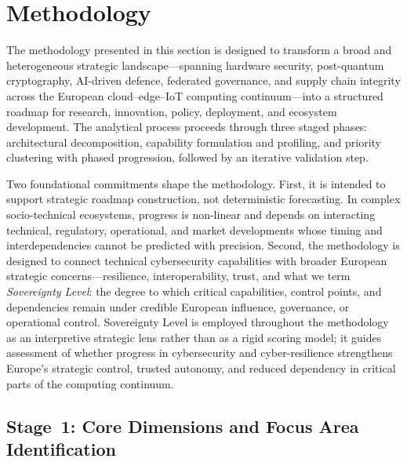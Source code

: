 
\section{Methodology}
\label{sec:methodology}

The methodology presented in this section is designed to transform a broad and heterogeneous strategic landscape---spanning hardware security, post-quantum cryptography, AI-driven defence, federated governance, and supply chain integrity across the European cloud--edge--IoT computing continuum---into a structured roadmap for research, innovation, policy, deployment, and ecosystem development. The analytical process proceeds through three staged phases: architectural decomposition, capability formulation and profiling, and priority clustering with phased progression, followed by an iterative validation step.

Two foundational commitments shape the methodology. First, it is intended to support strategic roadmap construction, not deterministic forecasting. In complex socio-technical ecosystems, progress is non-linear and depends on interacting technical, regulatory, operational, and market developments whose timing and interdependencies cannot be predicted with precision. Second, the methodology is designed to connect technical cybersecurity capabilities with broader European strategic concerns---resilience, interoperability, trust, and what we term \textit{Sovereignty Level}: the degree to which critical capabilities, control points, and dependencies remain under credible European influence, governance, or operational control. Sovereignty Level is employed throughout the methodology as an interpretive strategic lens rather than as a rigid scoring model; it guides assessment of whether progress in cybersecurity and cyber-resilience strengthens Europe's strategic control, trusted autonomy, and reduced dependency in critical parts of the computing continuum.


\subsection{Stage~1: Core Dimensions and Focus Area Identification}
\label{sec:meth-stage1}

